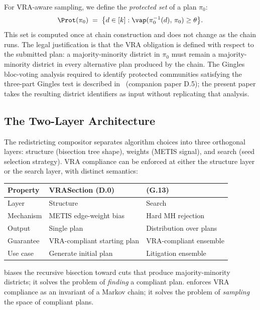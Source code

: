 For VRA-aware sampling, we define the \emph{protected set} of a plan $\pi_0$:
\[
  \Prot(\pi_0) \;=\; \bigl\{d \in [k] : \vap(\pi_0^{-1}(d),\, \pi_0) \geq \theta\bigr\}.
\]
This set is computed once at chain construction and does not change as the
chain runs.
The legal justification is that the VRA obligation is defined with respect to
the submitted plan: a majority-minority district in $\pi_0$ must remain a
majority-minority district in every alternative plan produced by the chain.
The Gingles bloc-voting analysis required to identify protected communities
satisfying the three-part Gingles test is described in~\cite{deluca2026gingles}
(companion paper D.5); the present paper takes the resulting district
identifiers as input without replicating that analysis.

\subsection{The Two-Layer Architecture}

The redistricting compositor separates algorithm choices into three orthogonal
layers: structure (bisection tree shape), weights (METIS signal), and search
(seed selection strategy).
VRA compliance can be enforced at either the structure layer or the search
layer, with distinct semantics:

\begin{center}
\begin{tabular}{lll}
\toprule
\textbf{Property} & \textbf{VRASection (D.0)} & \textbf{\vr{} (G.13)} \\
\midrule
Layer & Structure & Search \\
Mechanism & METIS edge-weight bias & Hard MH rejection \\
Output & Single plan & Distribution over plans \\
Guarantee & VRA-compliant starting plan & VRA-compliant ensemble \\
Use case & Generate initial plan & Litigation ensemble \\
\bottomrule
\end{tabular}
\end{center}

\noindent
\vraSection{} biases the recursive bisection toward cuts that produce
majority-minority districts; it solves the problem of \emph{finding} a
compliant plan.
\vr{} enforces VRA compliance as an invariant of a Markov chain; it solves
the problem of \emph{sampling} the space of compliant plans.

